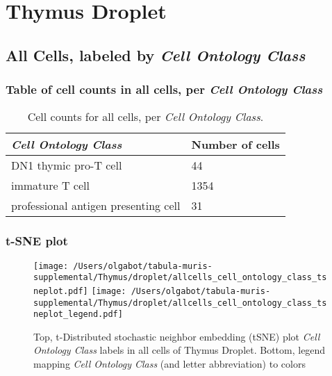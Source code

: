 \clearpage
\section{Thymus Droplet}

\subsection{All Cells, labeled by \emph{Cell Ontology Class}}
\subsubsection{Table of cell counts in all cells, per \emph{Cell Ontology Class}}\begin{table}[h]
\centering
\label{my-label}
\begin{tabular}{@{}ll@{}}
\toprule

\emph{Cell Ontology Class}& Number of cells \\ \midrule
DN1 thymic pro-T cell & 44 \\

immature T cell & 1354 \\

professional antigen presenting cell & 31 \\
\bottomrule
\end{tabular}
\caption{Cell counts for all cells, per \emph{Cell Ontology Class}.}
\end{table}

\clearpage
\subsubsection{t-SNE plot}
\begin{figure}[h]
\centering
\texttt{[image: /Users/olgabot/tabula-muris-supplemental/Thymus/droplet/allcells\_cell\_ontology\_class\_tsneplot.pdf]}
\texttt{[image: /Users/olgabot/tabula-muris-supplemental/Thymus/droplet/allcells\_cell\_ontology\_class\_tsneplot\_legend.pdf]}
\caption{Top, t-Distributed stochastic neighbor embedding (tSNE) plot  \emph{Cell Ontology Class} labels in all cells of Thymus Droplet. Bottom, legend mapping \emph{Cell Ontology Class} (and letter abbreviation) to colors}
\end{figure}


\clearpage

